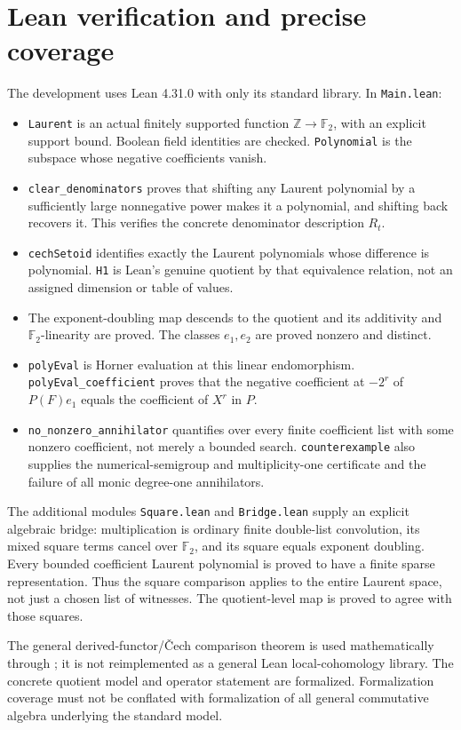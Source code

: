 \documentclass[11pt]{article}
\begin{document}
\section{Lean verification and precise coverage}
The development uses Lean 4.31.0 with only its standard library. In \texttt{Main.lean}:
\begin{itemize}
\item \texttt{Laurent} is an actual finitely supported function $\mathbb Z\to\mathbb F_2$, with an explicit support bound. Boolean field identities are checked. \texttt{Polynomial} is the subspace whose negative coefficients vanish.
\item \texttt{clear\_denominators} proves that shifting any Laurent polynomial by a sufficiently large nonnegative power makes it a polynomial, and shifting back recovers it. This verifies the concrete denominator description $R_t$.
\item \texttt{cechSetoid} identifies exactly the Laurent polynomials whose difference is polynomial. \texttt{H1} is Lean's genuine quotient by that equivalence relation, not an assigned dimension or table of values.
\item The exponent-doubling map descends to the quotient and its additivity and $\mathbb F_2$-linearity are proved. The classes $e_1,e_2$ are proved nonzero and distinct.
\item \texttt{polyEval} is Horner evaluation at this linear endomorphism. \texttt{polyEval\_coefficient} proves that the negative coefficient at $-2^r$ of $P(F)e_1$ equals the coefficient of $X^r$ in $P$.
\item \texttt{no\_nonzero\_annihilator} quantifies over every finite coefficient list with some nonzero coefficient, not merely a bounded search. \texttt{counterexample} also supplies the numerical-semigroup and multiplicity-one certificate and the failure of all monic degree-one annihilators.
\end{itemize}
The additional modules \texttt{Square.lean} and \texttt{Bridge.lean} supply an explicit algebraic bridge: multiplication is ordinary finite double-list convolution, its mixed square terms cancel over $\mathbb F_2$, and its square equals exponent doubling. Every bounded coefficient Laurent polynomial is proved to have a finite sparse representation. Thus the square comparison applies to the entire Laurent space, not just a chosen list of witnesses. The quotient-level map is proved to agree with those squares.

The general derived-functor/\v Cech comparison theorem is used mathematically through \cite{stacks1,stacks2}; it is not reimplemented as a general Lean local-cohomology library. The concrete quotient model and operator statement are formalized. Formalization coverage must not be conflated with formalization of all general commutative algebra underlying the standard model.
\end{document}
